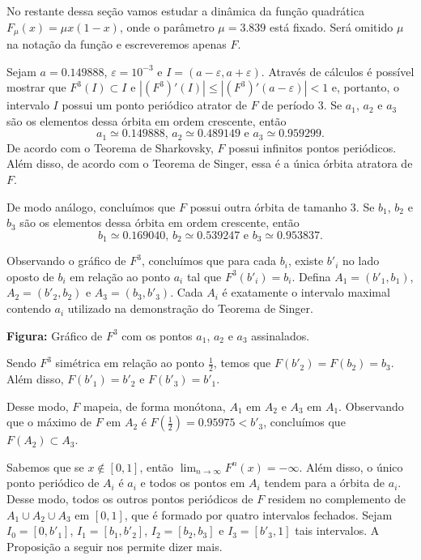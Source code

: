 No restante dessa seção vamos estudar a dinâmica da função quadrática $F_\mu(x) = \mu x(1-x)$, onde o parâmetro $\mu = 3.839$ está fixado. Será omitido $\mu$ na notação da função e escreveremos apenas $F$.

Sejam $a = 0.149888$, $\varepsilon = 10^{-3}$ e $I = (a - \varepsilon, a + \varepsilon)$. Através de cálculos é possível mostrar que $F^3(I) \subset I$ e $|(F^3)'(I)| \leq |(F^3)'(a - \varepsilon)| < 1$ e, portanto, o intervalo $I$ possui um ponto periódico atrator de $F$ de período $3$. Se $a_1$, $a_2$ e $a_3$ são os elementos dessa órbita em ordem crescente, então
$$a_1 \simeq 0.149888 \textrm{, } a_2 \simeq 0.489149 \textrm{ e } a_3 \simeq 0.959299.$$
De acordo com o Teorema de Sharkovsky, $F$ possui infinitos pontos periódicos. Além disso, de acordo com o Teorema de Singer, essa é a única órbita atratora de $F$.

De modo análogo, concluímos que $F$ possui outra órbita de tamanho $3$. Se $b_1$, $b_2$ e $b_3$ são os elementos dessa órbita em ordem crescente, então
$$b_1 \simeq 0.169040 \textrm{, } b_2 \simeq 0.539247  \textrm{ e } b_3 \simeq 0.953837.$$

Observando o gráfico de $F^3$, concluímos que para cada $b_i$, existe $b'_i$ no lado oposto de $b_i$ em relação ao ponto $a_i$ tal que $F^3(b'_i) = b_i$. Defina $A_1 = (b'_1, b_1)$, $A_2 = (b'_2, b_2)$ e $A_3 = (b_3, b'_3)$. Cada $A_i$ é exatamente o intervalo maximal contendo $a_i$ utilizado na demonstração do Teorema de Singer.

\begin{center}

{\small \textbf{Figura:} Gráfico de $F^3$ com os pontos $a_1$, $a_2$ e $a_3$ assinalados.}
\end{center}

Sendo $F^3$ simétrica em relação ao ponto $\frac{1}{2}$, temos que $F(b'_2) = F(b_2) = b_3$. Além disso, $F(b'_1) = b'_2$ e $F(b'_3) = b'_1$.

Desse modo, $F$ mapeia, de forma monótona, $A_1$ em $A_2$ e $A_3$ em $A_1$. Observando que o máximo de $F$ em $A_2$ é $F \left( \frac{1}{2} \right) = 0.95975 < b'_3$, concluímos que $F(A_2) \subset A_3$.

Sabemos que se $x \notin [0, 1]$, então $\lim_{n \to \infty} F^n(x) = -\infty$. Além disso, o único ponto periódico de $A_i$ é $a_i$ e todos os pontos em $A_i$ tendem para a órbita de $a_i$. Desse modo, todos os outros pontos periódicos de $F$ residem no complemento de $A_1 \cup A_2 \cup A_3$ em $[0, 1]$, que é formado por quatro intervalos fechados. Sejam $I_0 = [0, b'_1]$, $I_1 = [b_1, b'_2]$, $I_2 = [b_2, b_3]$ e $I_3 = [b'_3, 1]$ tais intervalos. A Proposição a seguir nos permite dizer mais.

